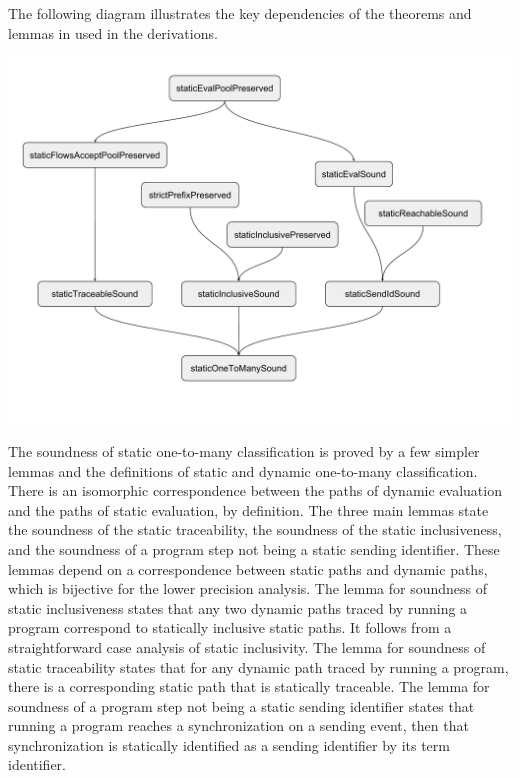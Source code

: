 \documentclass[letterpaper, 11pt]{extarticle}
\begin{document}
The following diagram illustrates the key dependencies of the theorems and lemmas in
used in the derivations.

\includegraphics[width=1\textwidth]{cml-proof-low.pdf}

The soundness of static one-to-many classification is proved by a few simpler lemmas and the
definitions of static and dynamic one-to-many classification.
There is an isomorphic correspondence between the paths of
dynamic evaluation and the paths of static evaluation, by definition.
The three main lemmas state the
soundness of the static traceability, the soundness of the static inclusiveness, and
the soundness of a program step not being a static sending identifier. These lemmas depend on a
correspondence between static paths and dynamic paths, which is bijective for the lower
precision analysis. The lemma for soundness of static inclusiveness states that any two
dynamic paths traced by running a program correspond to statically inclusive static paths. It
follows from a straightforward case analysis of static inclusivity. The lemma for soundness of
static traceability states that for any dynamic path traced by running a program, there
is a corresponding static path that is statically traceable. The lemma for soundness of a
program step not being a static sending identifier states that running a program reaches a
synchronization on a sending event, then that synchronization is statically identified as a
sending identifier by its term identifier.
\end{document}
